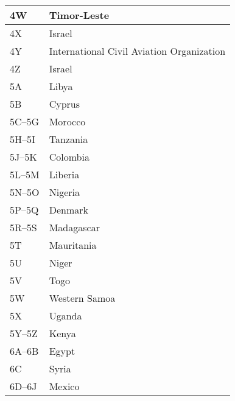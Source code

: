 \begin{longtable}{|l|l|}
  \hline
  4W                  & Timor-Leste                               \\
  \hline
  4X                  & Israel                                    \\
  \hline
  4Y                  & International Civil Aviation Organization \\
  \hline
  4Z                  & Israel                                    \\
  \hline
  5A                  & Libya                                     \\
  \hline
  5B                  & Cyprus                                    \\
  \hline
  5C--5G              & Morocco                                   \\
  \hline
  5H--5I              & Tanzania                                  \\
  \hline
  5J--5K              & Colombia                                  \\
  \hline
  5L--5M              & Liberia                                   \\
  \hline
  5N--5O              & Nigeria                                   \\
  \hline
  5P--5Q              & Denmark                                   \\
  \hline
  5R--5S              & Madagascar                                \\
  \hline
  5T                  & Mauritania                                \\
  \hline
  5U                  & Niger                                     \\
  \hline
  5V                  & Togo                                      \\
  \hline
  5W                  & Western Samoa                             \\
  \hline
  5X                  & Uganda                                    \\
  \hline
  5Y--5Z              & Kenya                                     \\
  \hline
  6A--6B              & Egypt                                     \\
  \hline
  6C                  & Syria                                     \\
  \hline
  6D--6J              & Mexico                                    \\
  \hline

\end{longtable}
